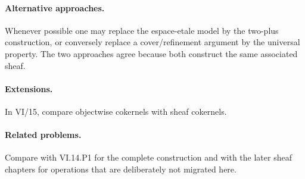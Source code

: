 \paragraph{Alternative approaches.}
Whenever possible one may replace the espace-etale model by the two-plus construction, or conversely replace a cover/refinement argument by the universal property.  The two approaches agree because both construct the same associated sheaf.

\paragraph{Extensions.}
In VI/15, compare objectwise cokernels with sheaf cokernels.

\paragraph{Related problems.}
Compare with VI.14.P1 for the complete construction and with the later sheaf chapters for operations that are deliberately not migrated here.
\fi
